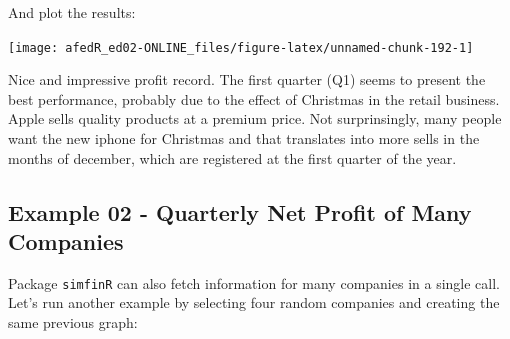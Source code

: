\documentclass[
  12pt,
]{book}
\newenvironment{Shaded}{\begin{snugshade}}{\end{snugshade}}
\newcommand{\CommentTok}[1]{\textcolor[rgb]{0.37,0.37,0.37}{\textit{#1}}}
\newcommand{\DataTypeTok}[1]{\textcolor[rgb]{0.27,0.27,0.27}{#1}}
\newcommand{\DecValTok}[1]{\textcolor[rgb]{0.06,0.06,0.06}{#1}}
\newcommand{\KeywordTok}[1]{\textcolor[rgb]{0.27,0.27,0.27}{\textbf{#1}}}
\newcommand{\NormalTok}[1]{#1}
\newcommand{\OperatorTok}[1]{\textcolor[rgb]{0.43,0.43,0.43}{\textbf{#1}}}
\newcommand{\StringTok}[1]{\textcolor[rgb]{0.5,0.5,0.5}{#1}}
\begin{document}
And plot the results:

\begin{center}\texttt{[image: afedR\_ed02-ONLINE\_files/figure-latex/unnamed-chunk-192-1]} \end{center}

Nice and impressive profit record. The first quarter (Q1) seems to present the best performance, probably due to the effect of Christmas in the retail business. Apple sells quality products at a premium price. Not surprinsingly, many people want the new iphone for Christmas and that translates into more sells in the months of december, which are registered at the first quarter of the year.

\hypertarget{example-02---quarterly-net-profit-of-many-companies}{%
\subsection{Example 02 - Quarterly Net Profit of Many Companies}\label{example-02---quarterly-net-profit-of-many-companies}}

Package \texttt{simfinR} can also fetch information for many companies in a single call. Let's run another example by selecting four random companies and creating the same previous graph:

\begin{Shaded}
\end{Shaded}
\end{document}
